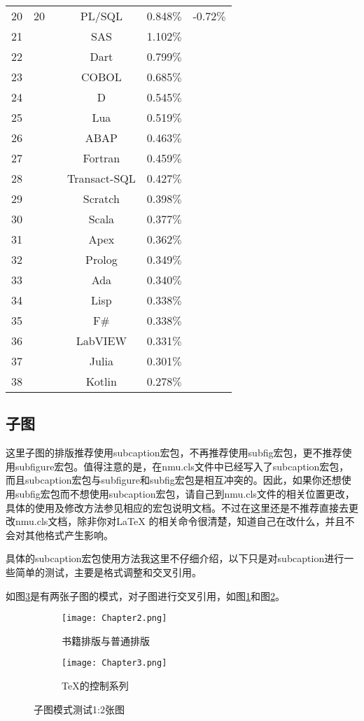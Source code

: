 \begin{longtabu}{cccccc}
20	&	20	&		&	PL/SQL	&	0.848$\%$	&	-0.72$\%$	\\
21	&		&		&	SAS	&	1.102$\%$	&		\\
22	&		&		&	Dart	&	0.799$\%$	&		\\
23	&		&		&	COBOL	&	0.685$\%$	&		\\
24	&		&		&	D	&	0.545$\%$	&		\\
25	&		&		&	Lua	&	0.519$\%$	&		\\
26	&		&		&	ABAP	&	0.463$\%$	&		\\
27	&		&		&	Fortran	&	0.459$\%$	&		\\
28	&		&		&	Transact-SQL	&	0.427$\%$	&		\\
29	&		&		&	Scratch	&	0.398$\%$	&		\\
30	&		&		&	Scala	&	0.377$\%$	&		\\
31	&		&		&	Apex	&	0.362$\%$	&		\\
32	&		&		&	Prolog	&	0.349$\%$	&		\\
33	&		&		&	Ada	&	0.340$\%$	&		\\
34	&		&		&	Lisp	&	0.338$\%$	&		\\
35	&		&		&	F$\#$	&	0.338$\%$	&		\\
36	&		&		&	LabVIEW	&	0.331$\%$	&		\\
37	&		&		&	Julia	&	0.301$\%$	&		\\
38	&		&		&	Kotlin	&	0.278$\%$	&		\\	
\end{longtabu}%

\subsection{子图}
这里子图的排版推荐使用subcaption宏包，不再推荐使用subfig宏包，更不推荐使用subfigure宏包。值得注意的是，在nmu.cls文件中已经写入了subcaption宏包，而且subcaption宏包与subfigure和subfig宏包是相互冲突的。因此，如果你还想使用subfig宏包而不想使用subcaption宏包，请自己到nmu.cls文件的相关位置更改，具体的使用及修改方法参见相应的宏包说明文档。不过在这里还是不推荐直接去更改nmu.cls文档，除非你对\LaTeX{} 的相关命令很清楚，知道自己在改什么，并且不会对其他格式产生影响。

具体的subcaption宏包使用方法我这里不仔细介绍，以下只是对subcaption进行一些简单的测试，主要是格式调整和交叉引用。

如图\ref{fig:subfig_test1}是有两张子图的模式，对子图进行交叉引用，如图\ref{subfig:1a}和图\ref{subfig:1b}。

\begin{figure}[htbp]
	\centering
	\begin{subfigure}[b]{.4\textwidth}
		\centering
		\texttt{[image: Chapter2.png]}
		\caption{书籍排版与普通排版}\label{subfig:1a}
	\end{subfigure}
	\quad
	\begin{subfigure}[b]{.4\textwidth}
		\centering
		\texttt{[image: Chapter3.png]}
		\caption{\TeX 的控制系列}\label{subfig:1b}
	\end{subfigure}
	\caption{子图模式测试1:2张图}\label{fig:subfig_test1}
\end{figure}

